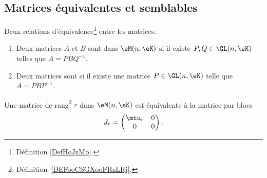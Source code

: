 \subsection{Matrices équivalentes et semblables}

\begin{propositionDef}  \label{DefBLELooTvlHoB}
	Deux relations d'équivalence\footnote{Définition \ref{DefHoJzMp}.} entre les matrices.
	\begin{enumerate}
		\item   \label{ItemPFXCooOUbSCt}
		      Deux matrices \( A\) et \( B\) sont  dans \( \eM(n,\eK)\) si il existe \( P,Q\in\GL(n,\eK)\) telles que \( A=PBQ^{-1}\).
		\item
		      Deux matrices sont  si il existe une matrice \( P\in \GL(n,\eK)\) telle que \( A=PBP^{-1}\).
	\end{enumerate}
\end{propositionDef}

\begin{lemma}   \label{LemZMxxnfM}
	Une matrice de rang\footnote{Définition~\ref{DEFooCSGXooFRzLRj}.} \( r\) dans \( \eM(n,\eK)\) est équivalente à la matrice par blocs
	\begin{equation}
		J_r=\begin{pmatrix}
			\mtu_r & 0 \\
			0      & 0
		\end{pmatrix}.
	\end{equation}
\end{lemma}

